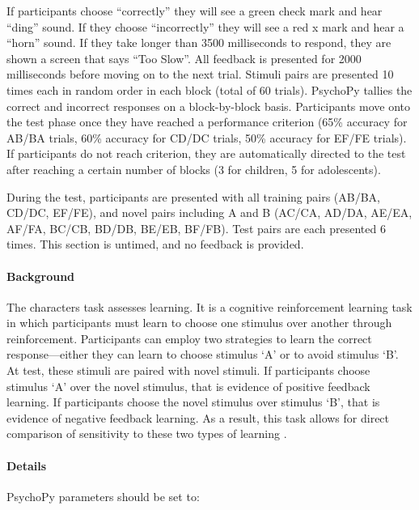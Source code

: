 \documentclass[
]{book}
\begin{document}
If participants choose ``correctly'' they will see a green check mark and hear ``ding'' sound. If they choose ``incorrectly'' they will see a red x mark and hear a ``horn'' sound. If they take longer than 3500 milliseconds to respond, they are shown a screen that says ``Too Slow''. All feedback is presented for 2000 milliseconds before moving on to the next trial. Stimuli pairs are presented 10 times each in random order in each block (total of 60 trials). PsychoPy tallies the correct and incorrect responses on a block-by-block basis. Participants move onto the test phase once they have reached a performance criterion (65\% accuracy for AB/BA trials, 60\% accuracy for CD/DC trials, 50\% accuracy for EF/FE trials). If participants do not reach criterion, they are automatically directed to the test after reaching a certain number of blocks (3 for children, 5 for adolescents).

During the test, participants are presented with all training pairs (AB/BA, CD/DC, EF/FE), and novel pairs including A and B (AC/CA, AD/DA, AE/EA, AF/FA, BC/CB, BD/DB, BE/EB, BF/FB). Test pairs are each presented 6 times. This section is untimed, and no feedback is provided.

\hypertarget{background-2}{%
\paragraph{Background}\label{background-2}}

The characters task assesses learning. It is a cognitive reinforcement learning task in which participants must learn to choose one stimulus over another through reinforcement. Participants can employ two strategies to learn the correct response---either they can learn to choose stimulus `A' or to avoid stimulus `B'. At test, these stimuli are paired with novel stimuli. If participants choose stimulus `A' over the novel stimulus, that is evidence of positive feedback learning. If participants choose the novel stimulus over stimulus `B', that is evidence of negative feedback learning. As a result, this task allows for direct comparison of sensitivity to these two types of learning \citep{frank_2004}.

\hypertarget{details-3}{%
\paragraph{Details}\label{details-3}}

PsychoPy parameters should be set to:
\end{document}
